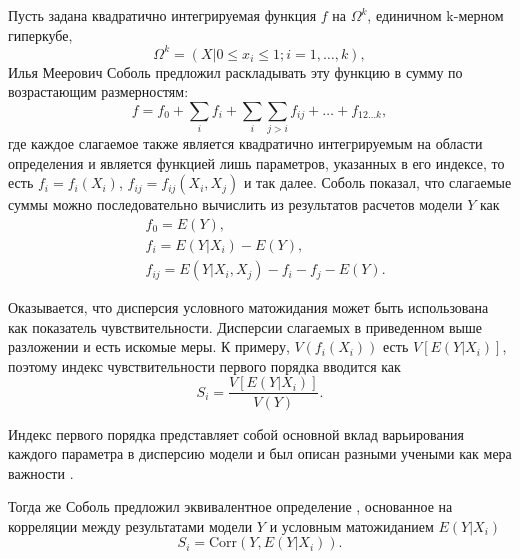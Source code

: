 \documentclass[a4paper,12pt]{article} %
\begin{document}
Пусть задана квадратично интегрируемая функция $f$ на $\Omega^k$, единичном k-мерном гиперкубе,
\begin{displaymath}
\Omega^k=(X|0\leq x_i \leq 1;i=1,\ldots ,k),
\end{displaymath}
Илья Меерович Соболь предложил раскладывать эту функцию в сумму по возрастающим размерностям:
\begin{displaymath}
f=f_0+\sum\limits_i f_i + \sum\limits_i \sum\limits_{j>i} f_{ij}+\ldots+f_{12\ldots k},
\end{displaymath}
где каждое слагаемое также является квадратично интегрируемым на области определения и является функцией лишь параметров, указанных в его индексе, то есть $f_i=f_i(X_i)$, $f_{ij}=f_{ij}(X_i,X_j)$ и так далее. Соболь показал, что слагаемые суммы можно последовательно вычислить из результатов расчетов модели $Y$ как
\begin{align*}
&f_0=E(Y), \\
&f_i=E(Y|X_i)-E(Y), \\
&f_{ij} = E(Y|X_i,X_j)-f_i-f_j-E(Y).
\end{align*}

Оказывается, что дисперсия условного матожидания может быть использована как показатель чувствительности. Дисперсии слагаемых в приведенном выше разложении и есть искомые меры. К примеру, $V(f_i(X_i))$ есть $V[E(Y|X_i)]$, поэтому индекс чувствительности первого порядка вводится как
\begin{displaymath}
S_i=\frac{V[E(Y|X_i)]}{V(Y)}.
\end{displaymath}

Индекс первого порядка представляет собой основной вклад варьирования каждого параметра в дисперсию модели и был описан разными учеными как мера важности \cite{hora1986comparison, ishigami1990importance, iman1990robust, saltelli1993sensitivity, homma1996importance}.

Тогда же Соболь предложил эквивалентное определение \cite{sobol1996freezing}, основанное на корреляции между результатами модели $Y$ и условным матожиданием $E(Y|X_i)$
\begin{displaymath}
S_i=\text{Corr}(Y,E(Y|X_i)).
\end{displaymath}
\end{document}
